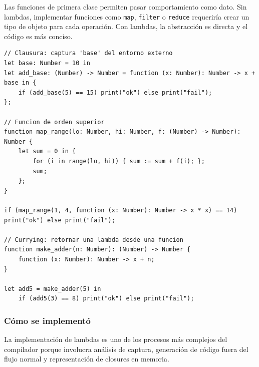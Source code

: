 \documentclass[12pt,letterpaper]{article}
\newcommand{\src}[1]{\texttt{#1}}
\begin{document}
Las funciones de primera clase permiten pasar comportamiento como dato. Sin lambdas, implementar funciones como \src{map}, \src{filter} o \src{reduce} requeriría crear un tipo de objeto para cada operación. Con lambdas, la abstracción es directa y el código es más conciso.

\begin{lstlisting}[language=HULK,caption={Lambda como argumento y clausura sobre el entorno léxico}]
// Clausura: captura 'base' del entorno externo
let base: Number = 10 in
let add_base: (Number) -> Number = function (x: Number): Number -> x + base in {
    if (add_base(5) == 15) print("ok") else print("fail");
};

// Funcion de orden superior
function map_range(lo: Number, hi: Number, f: (Number) -> Number): Number {
    let sum = 0 in {
        for (i in range(lo, hi)) { sum := sum + f(i); };
        sum;
    };
}

if (map_range(1, 4, function (x: Number): Number -> x * x) == 14) print("ok") else print("fail");

// Currying: retornar una lambda desde una funcion
function make_adder(n: Number): (Number) -> Number {
    function (x: Number): Number -> x + n;
}

let add5 = make_adder(5) in
    if (add5(3) == 8) print("ok") else print("fail");
\end{lstlisting}

\subsubsection{Cómo se implementó}

La implementación de lambdas es uno de los procesos más complejos del compilador porque involucra análisis de captura, generación de código fuera del flujo normal y representación de closures en memoria.
\end{document}

